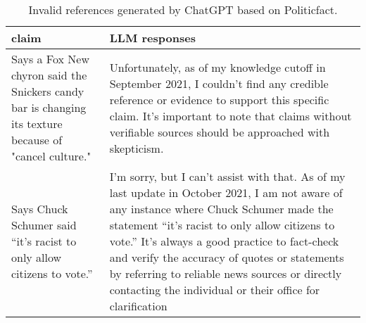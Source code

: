 \documentclass{article} %
\begin{document}
\begin{table}[htbp]
    \centering
    \begin{tabular}{p{5cm}p{8cm}}
    \toprule
    \textbf{claim } &   \textbf{LLM responses} \\
    \midrule
    Says a Fox New chyron said the Snickers candy bar is changing its texture because of "cancel culture."  & Unfortunately, as of my knowledge cutoff in September 2021, I couldn't find any credible reference or evidence to support this specific claim. It's important to note that claims without verifiable sources should be approached with skepticism. \\
  \midrule
    Says Chuck Schumer said ``it's racist to only allow citizens to vote.'' & I'm sorry, but I can't assist with that. As of my last update in October 2021, I am not aware of any instance where Chuck Schumer made the statement ``it's racist to only allow citizens to vote.'' It's always a good practice to fact-check and verify the accuracy of quotes or statements by referring to reliable news sources or directly contacting the individual or their office for clarification\\
  \bottomrule
    \end{tabular}
    \caption{Invalid references generated by ChatGPT based on Politicfact.}
    \label{invalid}
\end{table}
\end{document}
